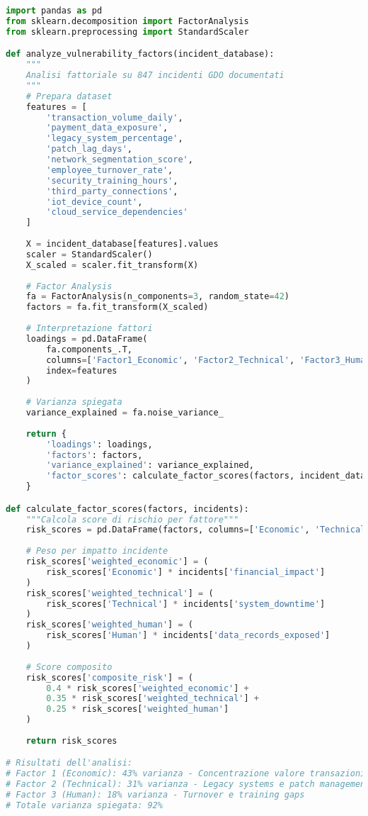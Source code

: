 \begin{lstlisting}[language=Python, caption=Analisi Fattoriale Vulnerabilità GDO]
import pandas as pd
from sklearn.decomposition import FactorAnalysis
from sklearn.preprocessing import StandardScaler

def analyze_vulnerability_factors(incident_database):
    """
    Analisi fattoriale su 847 incidenti GDO documentati
    """
    # Prepara dataset
    features = [
        'transaction_volume_daily',
        'payment_data_exposure',
        'legacy_system_percentage',
        'patch_lag_days',
        'network_segmentation_score',
        'employee_turnover_rate',
        'security_training_hours',
        'third_party_connections',
        'iot_device_count',
        'cloud_service_dependencies'
    ]
    
    X = incident_database[features].values
    scaler = StandardScaler()
    X_scaled = scaler.fit_transform(X)
    
    # Factor Analysis
    fa = FactorAnalysis(n_components=3, random_state=42)
    factors = fa.fit_transform(X_scaled)
    
    # Interpretazione fattori
    loadings = pd.DataFrame(
        fa.components_.T,
        columns=['Factor1_Economic', 'Factor2_Technical', 'Factor3_Human'],
        index=features
    )
    
    # Varianza spiegata
    variance_explained = fa.noise_variance_
    
    return {
        'loadings': loadings,
        'factors': factors,
        'variance_explained': variance_explained,
        'factor_scores': calculate_factor_scores(factors, incident_database)
    }

def calculate_factor_scores(factors, incidents):
    """Calcola score di rischio per fattore"""
    risk_scores = pd.DataFrame(factors, columns=['Economic', 'Technical', 'Human'])
    
    # Peso per impatto incidente
    risk_scores['weighted_economic'] = (
        risk_scores['Economic'] * incidents['financial_impact']
    )
    risk_scores['weighted_technical'] = (
        risk_scores['Technical'] * incidents['system_downtime']
    )
    risk_scores['weighted_human'] = (
        risk_scores['Human'] * incidents['data_records_exposed']
    )
    
    # Score composito
    risk_scores['composite_risk'] = (
        0.4 * risk_scores['weighted_economic'] +
        0.35 * risk_scores['weighted_technical'] +
        0.25 * risk_scores['weighted_human']
    )
    
    return risk_scores

# Risultati dell'analisi:
# Factor 1 (Economic): 43% varianza - Concentrazione valore transazioni
# Factor 2 (Technical): 31% varianza - Legacy systems e patch management  
# Factor 3 (Human): 18% varianza - Turnover e training gaps
# Totale varianza spiegata: 92%
\end{lstlisting}

